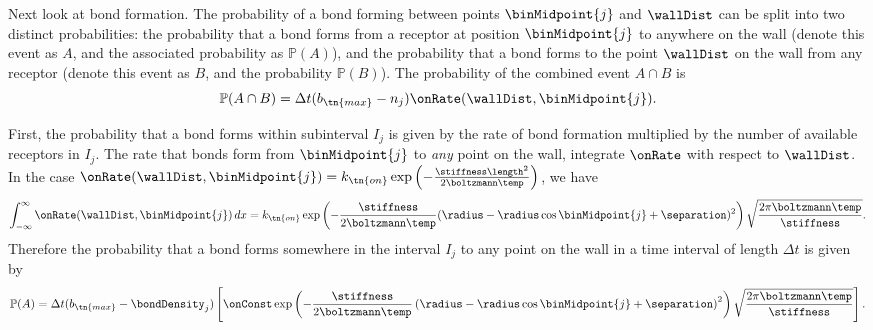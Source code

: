 Next look at bond formation. The probability of a bond forming between
points $\binMidpoint{j}$ and $\wallDist$ can be split into two distinct
probabilities: the probability that a bond forms from a receptor at
position $\binMidpoint{j}$ to anywhere on the wall (denote this event as
$A$, and the associated probability as $\mathbb{P}(A)$), and the
probability that a bond forms to the point $\wallDist$ on the wall
from any receptor (denote this event as $B$, and the probability
$\mathbb{P}(B)$). The probability of the combined event $A \cap B$ is
\begin{equation}
  \label{eq:joint-prob}
  \mathbb{P}(A \cap B) = \Delta t (b_\tn{max} - n_j)
  \onRate(\wallDist, \binMidpoint{j}).
\end{equation}




First, the probability that a bond forms within subinterval $I_j$ is
given by the rate of bond formation multiplied by the number of
available receptors in $I_j$. The rate that bonds form from
$\binMidpoint{j}$ to \emph{any} point on the wall, integrate $\onRate$
with respect to $\wallDist$. In the case $\onRate(\wallDist,
\binMidpoint{j}) = k_\tn{on} \exp\left(-\frac{\stiffness
    \length^2}{2\boltzmann \temp}\right)$, we have
\begin{equation}
  \label{eq:total_fm_rate}
  \int_{-\infty}^{\infty} \onRate(\wallDist, \binMidpoint{j})\, dx = k_\tn{on} \exp
  \left( -\frac{\stiffness}{2\boltzmann \temp} (\radius - \radius
    \cos\binMidpoint{j} + \separation)^2 \right) \sqrt{\frac{2 \pi
      \boltzmann \temp}{\stiffness}}.
\end{equation}
Therefore the probability that a bond forms somewhere in the interval
$I_j$ to any point on the wall in a time interval of length $\Delta t$
is given by 
\begin{equation}
  \label{eq:form-prob}
  \mathbb{P}(A) = \Delta t (b_\tn{max} - \bondDensity_j) \left[ \onConst
    \exp \left( - \frac{\stiffness}{2 \boltzmann \temp} \left( \radius
        - \radius\cos\binMidpoint{j} + \separation \right)^2 \right)
    \sqrt{\frac{2\pi \boltzmann \temp}{\stiffness}} \right].
\end{equation}

